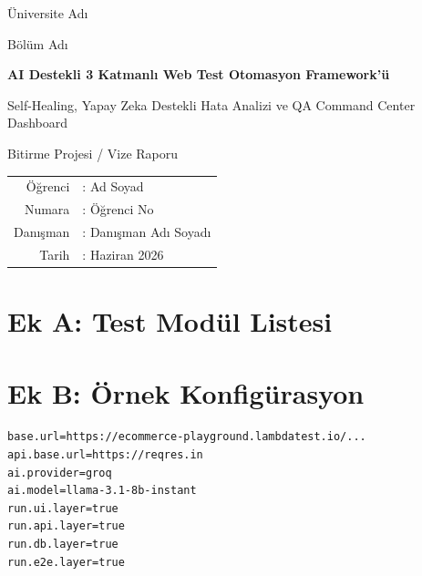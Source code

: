 \documentclass[12pt,a4paper,twoside]{report}
\newcommand{\raporBaslik}{AI Destekli 3 Katmanlı Web Test Otomasyon Framework'ü}
\newcommand{\raporAltBaslik}{Self-Healing, Yapay Zeka Destekli Hata Analizi ve QA Command Center Dashboard}
\newcommand{\ogrenciAd}{Ad Soyad}
\newcommand{\ogrenciNo}{Öğrenci No}
\newcommand{\danisman}{Danışman Adı Soyadı}
\newcommand{\universite}{Üniversite Adı}
\newcommand{\bolum}{Bölüm Adı}
\newcommand{\tarih}{Haziran 2026}
\begin{document}
\begin{titlepage}
  \centering
  \vspace*{1.5cm}
  {\Large \universite \par}
  {\large \bolum \par}
  \vspace{2cm}
  {\LARGE\bfseries \raporBaslik \par}
  \vspace{0.8cm}
  {\large \raporAltBaslik \par}
  \vspace{2.5cm}
  {\large Bitirme Projesi / Vize Raporu \par}
  \vspace{2cm}
  \begin{tabular}{rl}
    Öğrenci  & : \ogrenciAd \\
    Numara   & : \ogrenciNo \\
    Danışman & : \danisman \\
    Tarih    & : \tarih \\
  \end{tabular}
  \vfill
\end{titlepage}



\tableofcontents
\clearpage
\listoffigures
\clearpage
\listoftables
\clearpage


\clearpage













\appendix
\chapter{Ek A: Test Modül Listesi}


\chapter{Ek B: Örnek Konfigürasyon}
\begin{lstlisting}[language=bash,caption={config.example.properties özeti}]
base.url=https://ecommerce-playground.lambdatest.io/...
api.base.url=https://reqres.in
ai.provider=groq
ai.model=llama-3.1-8b-instant
run.ui.layer=true
run.api.layer=true
run.db.layer=true
run.e2e.layer=true
\end{lstlisting}


\end{document}
